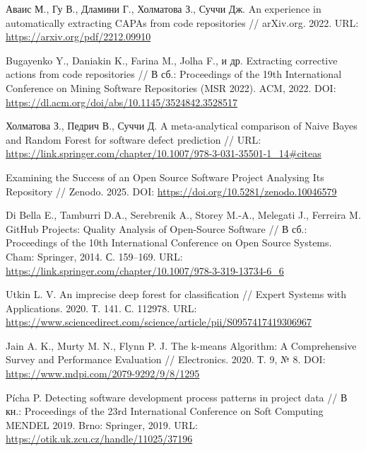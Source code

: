 \printbibliography[title={Список использованных источников}]


\begin{thebibliography}{99}
	
	\label{Awais2022}
	Аваис М., Гу В., Дламини Г., Холматова З., Суччи Дж.  
	An experience in automatically extracting CAPAs from code repositories // arXiv.org. 2022.  
	URL: \url{https://arxiv.org/pdf/2212.09910}
	
	\label{Bugayenko2022}
	Bugayenko Y., Daniakin K., Farina M., Jolha F., и др.  
	Extracting corrective actions from code repositories //  
	В сб.: Proceedings of the 19th International Conference on Mining Software Repositories (MSR 2022). ACM, 2022.  
	DOI: \url{https://dl.acm.org/doi/abs/10.1145/3524842.3528517}
	
	\label{Holmatova2021}
	Холматова З., Педрич В., Суччи Д.  
	A meta-analytical comparison of Naive Bayes and Random Forest for software defect prediction // 
	URL: \url{https://link.springer.com/chapter/10.1007/978-3-031-35501-1_14#citeas}
	
	\label{Zenodo2025}
	Examining the Success of an Open Source Software Project Analysing Its Repository //  
	Zenodo. 2025.  
	DOI: \url{https://doi.org/10.5281/zenodo.10046579}
	
	\label{DiBella2014}
	Di Bella E., Tamburri D.A., Serebrenik A., Storey M.-A., Melegati J., Ferreira M.  
	GitHub Projects: Quality Analysis of Open-Source Software //  
	В сб.: Proceedings of the 10th International Conference on Open Source Systems.  
	Cham: Springer, 2014. С. 159–169.  
	URL: \url{https://link.springer.com/chapter/10.1007/978-3-319-13734-6_6}
	
	\label{Utkin2020}
	Utkin L. V.  
	An imprecise deep forest for classification // Expert Systems with Applications.  
	2020. Т. 141. С. 112978.  
	URL: \url{https://www.sciencedirect.com/science/article/pii/S0957417419306967}
	
	\label{Jain2020}
	Jain A. K., Murty M. N., Flynn P. J.  
	The k-means Algorithm: A Comprehensive Survey and Performance Evaluation //  
	Electronics. 2020. Т. 9, № 8.  
	DOI: \url{https://www.mdpi.com/2079-9292/9/8/1295}
	
	\label{Picha2019}
	Pícha P.  
	Detecting software development process patterns in project data //  
	В кн.: Proceedings of the 23rd International Conference on Soft Computing MENDEL 2019.  
	Brno: Springer, 2019.  
	URL: \url{https://otik.uk.zcu.cz/handle/11025/37196}
	

\end{thebibliography}
